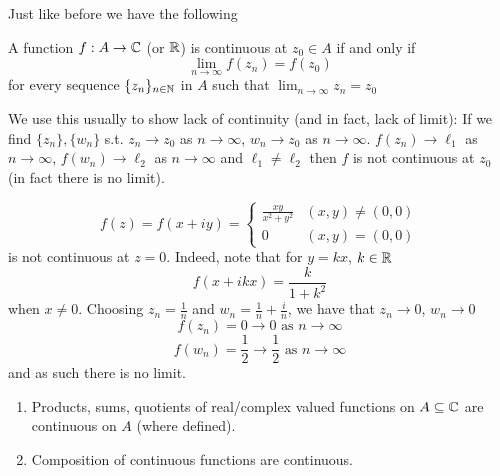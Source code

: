 \documentclass[10pt, a4paper]{article}
\begin{document}
Just like before we have the following

\begin{lemma}
    A function $f : A \to \mathbb{C}$
    (or $\mathbb{R}$)
    is continuous at $z_0 \in A$ if and only if
    \[
    \lim_{n \to \infty}f(z_n) = f(z_0)
    \]
    for every sequence $\{z_n\}_{n \in \mathbb{N}}$ in $A$ such that $\lim_{n \to \infty}z_n = z_0$
\end{lemma}

We use this usually to show lack of continuity
(and in fact,
lack of limit):
If we find $\{z_n\}, \{w_n\}$ s.t. $z_n \to z_0$ as $n \to \infty$,
$w_n \to z_0$ as $n \to \infty$.
$f(z_n) \to \ell_1$ as $n \to \infty$,
$f(w_n) \to \ell_2$ as $n \to \infty$ and $\ell_1 \neq \ell_2$ then $f$ is not continuous at $z_0$
(in fact there is no limit).

\begin{example}
    \[
    f(z) = f(x + iy) = \begin{cases}
        \frac{xy}{x ^ 2 + y ^ 2} &(x, y) \neq (0, 0) \\
        0 &(x, y) = (0, 0)
    \end{cases}
    \]
    is not continuous at $z = 0$.
    Indeed,
    note that for $y = kx$,
    $k \in \mathbb{R}$
    \[
    f(x + ikx) = \frac{k}{1 + k ^ 2}
    \]
    when $x \neq 0$.
    Choosing $z_n = \frac{1}{n}$ and $w_n = \frac{1}{n} + \frac{i}{n}$,
    we have that $z_n \to 0$,
    $w_n \to 0$
    \[
    f(z_n) = 0 \to 0\text{ as $n \to \infty$}
    \]
    \[
    f(w_n) = \frac{1}{2} \to \frac{1}{2}\text{ as $n \to \infty$}
    \]
    and as such there is no limit.
\end{example}

\begin{lemma}\phantom{}
    \begin{enumerate}[label = (\roman*)]
        \item Products,
        sums,
        quotients of real/complex valued functions on $A \subseteq \mathbb{C}$ are continuous on $A$
        (where defined).

        \item Composition of continuous functions are continuous.
    \end{enumerate}
\end{lemma}
\end{document}
